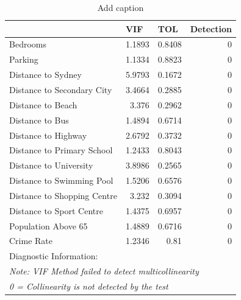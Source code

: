 \renewcommand{\baselinestretch}{0.8}
\begin{table}[H]
  \centering
    \small    \begin{tabular}{llll}
          & \textbf{VIF}   & \textbf{TOL}   & \textbf{Detection} \\
    \midrule
    Bedrooms & \multicolumn{1}{r}{1.1893} & \multicolumn{1}{r}{0.8408} & \multicolumn{1}{r}{0} \\
    Parking & \multicolumn{1}{r}{1.1334} & \multicolumn{1}{r}{0.8823} & \multicolumn{1}{r}{0} \\
    Distance to Sydney & \multicolumn{1}{r}{5.9793} & \multicolumn{1}{r}{0.1672} & \multicolumn{1}{r}{0} \\
    Distance to Secondary City & \multicolumn{1}{r}{3.4664} & \multicolumn{1}{r}{0.2885} & \multicolumn{1}{r}{0} \\
    Distance to Beach & \multicolumn{1}{r}{3.376} & \multicolumn{1}{r}{0.2962} & \multicolumn{1}{r}{0} \\
    Distance to Bus & \multicolumn{1}{r}{1.4894} & \multicolumn{1}{r}{0.6714} & \multicolumn{1}{r}{0} \\
    Distance to Highway & \multicolumn{1}{r}{2.6792} & \multicolumn{1}{r}{0.3732} & \multicolumn{1}{r}{0} \\
    Distance to Primary School & \multicolumn{1}{r}{1.2433} & \multicolumn{1}{r}{0.8043} & \multicolumn{1}{r}{0} \\
    Distance to University & \multicolumn{1}{r}{3.8986} & \multicolumn{1}{r}{0.2565} & \multicolumn{1}{r}{0} \\
    Distance to Swimming Pool & \multicolumn{1}{r}{1.5206} & \multicolumn{1}{r}{0.6576} & \multicolumn{1}{r}{0} \\
    Distance to Shopping Centre & \multicolumn{1}{r}{3.232} & \multicolumn{1}{r}{0.3094} & \multicolumn{1}{r}{0} \\
    Distance to Sport Centre & \multicolumn{1}{r}{1.4375} & \multicolumn{1}{r}{0.6957} & \multicolumn{1}{r}{0} \\
    Population Above 65 & \multicolumn{1}{r}{1.4889} & \multicolumn{1}{r}{0.6716} & \multicolumn{1}{r}{0} \\
    Crime Rate & \multicolumn{1}{r}{1.2346} & \multicolumn{1}{r}{0.81} & \multicolumn{1}{r}{0} \\
    \midrule
    Diagnostic Information: &       &       &  \\
    \multicolumn{4}{l}{\textit{Note: VIF Method failed to detect multicollinearity}} \\
    \multicolumn{4}{l}{\textit{0 = Collinearity is not detected by the test}} \\
    \end{tabular}%
    \caption{Add caption}
    \label{tab:VIF_Score}%
    \end{table}%

